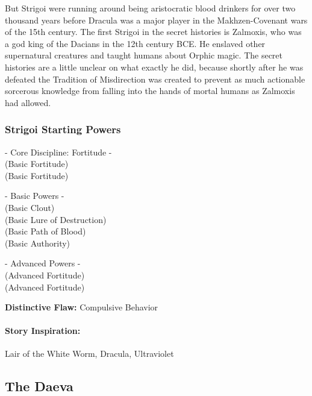 But Strigoi were running around being aristocratic blood drinkers for over two thousand years before Dracula was a major player in the Makhzen-Covenant wars of the 15th century. The first Strigoi in the secret histories is Zalmoxis, who was a god king of the Dacians in the 12th century BCE. He enslaved other supernatural creatures and taught humans about Orphic magic. The secret histories are a little unclear on what exactly he did, because shortly after he was defeated the Tradition of Misdirection was created to prevent as much actionable sorcerous knowledge from falling into the hands of mortal humans as Zalmoxis had allowed.

\subsubsection{Strigoi Starting Powers}

\hspace{\parindent} - Core Discipline: Fortitude -\\
 (Basic Fortitude)\\
 (Basic Fortitude)

- Basic Powers -\\
 (Basic Clout)\\
 (Basic Lure of Destruction)\\
 (Basic Path of Blood)\\
 (Basic Authority)

- Advanced Powers -\\
 (Advanced Fortitude)\\
 (Advanced Fortitude)

\textbf{Distinctive Flaw:} Compulsive Behavior

\paragraph{Story Inspiration:} Lair of the White Worm, Dracula, Ultraviolet

\subsection[Daeva]{The Daeva} 

